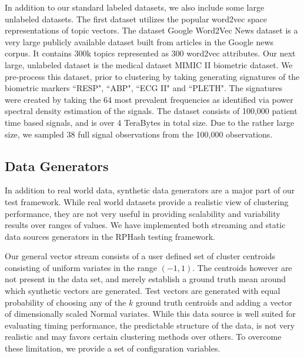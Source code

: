 In addition to our standard labeled datasets, we also include some large unlabeled datasets.  The
first dataset utilizes the popular word2vec \cite{word2vec} space representations of topic vectors.
The dataset Google Word2Vec News dataset \cite{googlenews} is a very large publicly available
dataset built from articles in the Google news corpus.  It contains 300k topics represented as 300
word2vec attributes.  Our next large, unlabeled dataset is the medical dataset MIMIC II
\cite{MIMICII} biometric dataset.  We pre-process this dataset, prior to clustering by taking
generating signatures of the biometric markers ``RESP", ``ABP", ``ECG II" and ``PLETH".  The
signatures were created by taking the 64 most prevalent frequencies as identified via power spectral
density estimation of the signals. The dataset consists of 100,000 patient time based signals, and
is over 4 TeraBytes in total size.  Due to the rather large size, we sampled 38 full signal
observations from the 100,000 observations.

\subsection{Data Generators}\label{synth_data}

In addition to real world data, synthetic data generators are a major part of our test framework.
While real world datasets provide a realistic view of clustering performance, they are not very
useful in providing scalability and variability results over ranges of values.  We have implemented
both streaming and static data sources generators in the \textsf{RPHash} testing framework.

Our general vector stream consists of a user defined set of cluster centroids consisting of uniform
variates in the range $(-1,1)$.  The centroids however are not present in the data set, and merely
establish a ground truth mean around which synthetic vectors are generated.  Test vectors are
generated with equal probability of choosing any of the $k$ ground truth centroids and adding a
vector of dimensionally scaled Normal variates.  While this data source is well suited for
evaluating timing performance, the predictable structure of the data, is not very realistic and may
favors certain clustering methods over others.  To overcome these limitation, we provide a set of
configuration variables.

